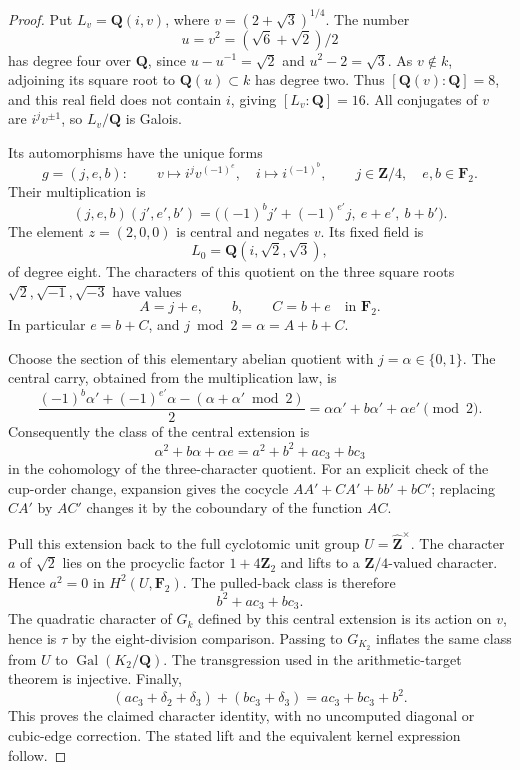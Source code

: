 \begin{proof}
Put \(L_v=\mathbf Q(i,v)\), where \(v=(2+\sqrt3)^{1/4}\).
The number
\[
 u=v^2=(\sqrt6+\sqrt2)/2
\]
has degree four over \(\mathbf Q\), since
\(u-u^{-1}=\sqrt2\) and \(u^2-2=\sqrt3\).
As \(v\notin k\), adjoining its square root to
\(\mathbf Q(u)\subset k\) has degree two. Thus
\([\mathbf Q(v):\mathbf Q]=8\), and this real field does not
contain \(i\), giving \([L_v:\mathbf Q]=16\).
All conjugates of \(v\) are \(i^jv^{\pm1}\), so \(L_v/\mathbf Q\)
is Galois.

Its automorphisms have the unique forms
\[
 g=(j,e,b):\qquad
 v\longmapsto i^jv^{(-1)^e},\quad
 i\longmapsto i^{(-1)^b},
 \qquad j\in\mathbf Z/4,\quad e,b\in\mathbf F_2.
\]
Their multiplication is
\[
 (j,e,b)(j',e',b')
   =\bigl((-1)^b j'+(-1)^{e'}j,\ e+e',\ b+b'\bigr).
\]
The element \(z=(2,0,0)\) is central and negates \(v\).
Its fixed field is
\[
                   L_0=\mathbf Q(i,\sqrt2,\sqrt3),
\]
of degree eight. The characters of this quotient on the three
square roots \(\sqrt2,\sqrt{-1},\sqrt{-3}\) have values
\[
                         A=j+e,\qquad b,\qquad C=b+e
                         \quad\text{in }\mathbf F_2.
\]
In particular \(e=b+C\), and \(j\bmod2=\alpha=A+b+C\).

Choose the section of this elementary abelian quotient with
\(j=\alpha\in\{0,1\}\).
The central carry, obtained from the multiplication law, is
\[
 \frac{(-1)^b\alpha'+(-1)^{e'}\alpha
                    -(\alpha+\alpha'\bmod2)}2
  =\alpha\alpha'+b\alpha'+\alpha e'\pmod2.
\]
Consequently the class of the central extension is
\[
                         \alpha^2+b\alpha+\alpha e
                  =a^2+b^2+a c_3+b c_3
\]
in the cohomology of the three-character quotient.
For an explicit check of the cup-order change, expansion gives
the cocycle \(AA'+CA'+bb'+bC'\); replacing \(CA'\) by \(AC'\)
changes it by the coboundary of the function \(AC\).

Pull this extension back to the full cyclotomic unit group
\(U=\widehat{\mathbf Z}^{\times}\).
The character \(a\) of \(\sqrt2\) lies on the procyclic factor
\(1+4\mathbf Z_2\) and lifts to a \(\mathbf Z/4\)-valued
character. Hence \(a^2=0\) in \(H^2(U,\mathbf F_2)\).
The pulled-back class is therefore
\[
                            b^2+a c_3+b c_3.
\]
The quadratic character of \(G_k\) defined by this central
extension is its action on \(v\), hence is \(\tau\) by the
eight-division comparison. Passing to \(G_{K_2}\) inflates the
same class from \(U\) to
\(\operatorname{Gal}(K_2/\mathbf Q)\).
The transgression used in the arithmetic-target theorem is
injective. Finally,
\[
 (a c_3+\delta_2+\delta_3)+(b c_3+\delta_3)
                          =a c_3+b c_3+b^2.
\]
This proves the claimed character identity, with no uncomputed
diagonal or cubic-edge correction.
The stated lift and the equivalent kernel expression follow.
\end{proof}

